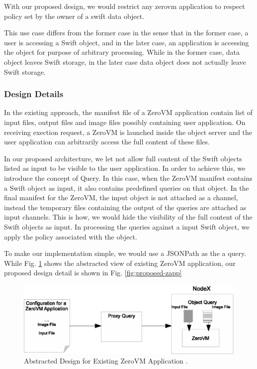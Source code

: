 \begin{appendices}
With our proposed design, we would restrict any zerovm application to respect policy set by the owner of a swift data object.

This use case differs from the former case  in the sense that in the former case, a user is accessing a Swift object, and in the later case, an application is accessing the object for purpose of arbitrary processing. While in the former case, data object leaves Swift storage, in the later case data object does not actually leave Swift storage.

\subsubsection{Design Details} 
In the existing approach, the manifest file of a ZeroVM application contain list of input files, output files and image files possibly containing user application.  On receiving exection request, a ZeroVM is launched inside the object server and the user application can arbitrarily access the full content of these files. 

In our proposed architecture, we let not allow full content of the Swift objects listed as input to be visible to the user application. In order to achieve this, we introduce the concept of Query. In this case,  when the ZeroVM manifest contains a Swift object as input, it also contains predefined queries on that object.  In the final manifest for the ZeroVM, the input object is not attached as a channel, instead the temporary files containing the output of the queries are attached as input channels. This is how, we would hide the visibility of the full content of the Swift objects as input.  In processing the queries against a input Swift object, we apply the policy associated with the  object.

 To make our implementation simple, we would use a JSONPath as the a query. While Fig. \ref{fig:abstracted-zapp} shows the abstracted view of existing ZeroVM application, our proposed design detail is shown in Fig. \ref{fig:proposed-zapp}

\begin{figure}[t]
\centering
\includegraphics {eps/abstracted-zapp}
\caption{Abstracted Design for Existing ZeroVM Application .}
\label{fig:abstracted-zapp}
\end{figure}


\end{appendices}
